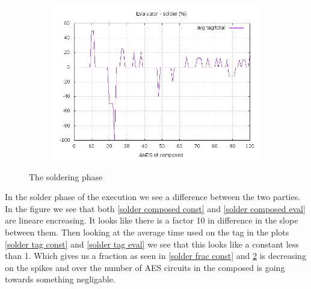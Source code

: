 \documentclass[10pt,a4paper]{article}
\begin{document}
\begin{figure}[h]
\begin{subfigure}[t]{0.3\textwidth}
        \includegraphics[width=\textwidth]{eval_solder_frac}
        \caption{}
        \label{solder frac eval}
    \end{subfigure}
    \caption{The soldering phase}
\end{figure}

In the solder phase of the execution we see a difference between the two parties. In the figure we see that both \ref{solder composed const} and \ref{solder composed eval} are lineare encreasing. It looks like there is a factor 10 in difference in the slope between them. Then looking at the average time used on the tag in the plots \ref{solder tag const} and \ref{solder tag eval} we see that this looks like a constant less than 1. Which gives us a fraction as seen in \ref{solder frac const} and \ref{solder frac eval} is decreasing on the spikes and over the number of AES circuits in the composed is going towards something negligable.
\end{document}
